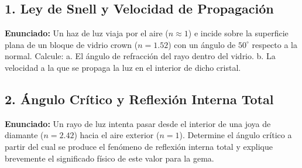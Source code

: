 \documentclass[12pt, letterpaper]{article}
\begin{document}
\vspace{0.5cm}

\subsection*{1. Ley de Snell y Velocidad de Propagación}
\noindent \textbf{Enunciado:} Un haz de luz viaja por el aire ($n \approx 1$) e incide sobre la superficie plana de un bloque de vidrio crown ($n = 1.52$) con un ángulo de $50^{\circ}$ respecto a la normal. Calcule: a. El ángulo de refracción del rayo dentro del vidrio. b. La velocidad a la que se propaga la luz en el interior de dicho cristal.


\subsection*{2. Ángulo Crítico y Reflexión Interna Total}
\noindent \textbf{Enunciado:} Un rayo de luz intenta pasar desde el interior de una joya de diamante ($n = 2.42$) hacia el aire exterior ($n = 1$). Determine el ángulo crítico a partir del cual se produce el fenómeno de reflexión interna total y explique brevemente el significado físico de este valor para la gema.
\end{document}
